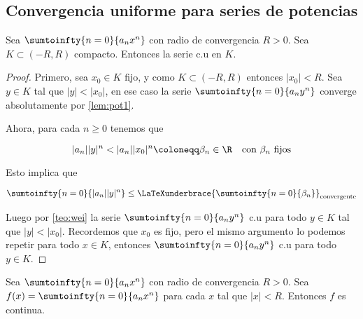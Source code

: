 \subsection{Convergencia uniforme para series de potencias}

\begin{teo}
    Sea $\sumtoinfty{n=0}{a_nx^n}$ con radio de convergencia $R > 0$. Sea $K \subset (-R,R)$ compacto. Entonces la serie c.u en $K$.
\end{teo}

\begin{proof}
    Primero, sea $x_0 \in K$ fijo, y como $K \subset (-R, R)$ entonces $|x_0|<R$. Sea $y \in K$ tal que $|y|<|x_0|$, en ese caso la serie $\sumtoinfty{n=0}{a_ny^n}$ converge absolutamente por \ref{lem:pot1}.
    
    Ahora, para cada $n \geq 0$ tenemos que
    
    \[
    |a_n||y|^n < |a_n||x_0|^n \coloneqq \beta_n \in \R \quad \text{con $\beta_n$ fijos}
    \]
    
    Esto implica que
    
    \[
    \sumtoinfty{n=0}{|a_n||y|^n} \leq \LaTeXunderbrace{\sumtoinfty{n=0}{\beta_n}}_{\text{convergente}}
    \]
    
    Luego por \ref{teo:wei} la serie $\sumtoinfty{n=0}{a_ny^n}$ c.u para todo $y \in K$ tal que $|y| < |x_0|$. Recordemos que $x_0$ es fijo, pero el mismo argumento lo podemos repetir para todo $x \in K$, entonces $\sumtoinfty{n=0}{a_ny^n}$ c.u para todo $y \in K$.
\end{proof}

\begin{teo}
    Sea $\sumtoinfty{n=0}{a_nx^n}$ con radio de convergencia $R>0$. Sea $f(x) = \sumtoinfty{n=0}{a_nx^n}$ para cada $x$ tal que $|x|<R$. Entonces $f$ es continua.
\end{teo}

